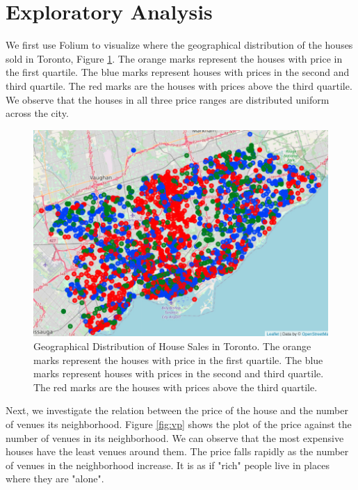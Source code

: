 \documentclass{article}
\begin{document}
\section{Exploratory Analysis}

We first use Folium to visualize where the geographical distribution of the houses sold in Toronto, Figure \ref{fig:map1}. The orange marks represent the houses with price in the first quartile. The blue marks represent houses with prices in the second and third quartile. The red marks are the houses with prices above the third quartile. We observe that the houses in all three price ranges are distributed uniform across the city. 

\begin{figure}[hbt!]
	
	\includegraphics[width=\textwidth]{map1.jpg}
	\caption{Geographical Distribution of House Sales in Toronto. The orange marks represent the houses with price in the first quartile. The blue marks represent houses with prices in the second and third quartile. The red marks are the houses with prices above the third quartile.}
	\label{fig:map1}
	
\end{figure}

Next, we investigate the relation between the price of the house and the number of venues its neighborhood. Figure \ref{fig:vp} shows the plot of the price against the number of venues in its neighborhood. We can observe that the most expensive houses have the least venues around them. The price falls rapidly as the number of venues in the neighborhood increase. It is as if "rich" people live in places where they are "alone".
\end{document}
